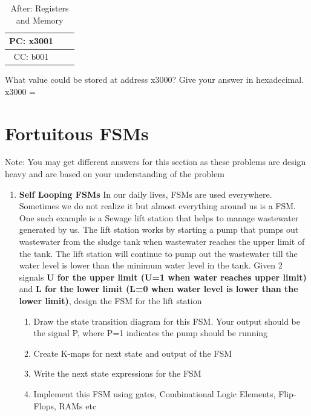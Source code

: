 \documentclass{article}
\begin{document}
\begin{enumerate}[label=(\alph*)]
\begin{enumerate}[label=(\roman*)]
\begin{table}[h]
\begin{tabular}{|c|c|c|}
            PC: x3001 & & \\
            \hline
            CC: b001 & & \\
            \hline
            \end{tabular}
            \caption{After: Registers and Memory}
            \end{table}
            \newline
            What value could be stored at address x3000? Give your answer in hexadecimal.
            \newline
            \newline
            x3000 =
        \end{enumerate}
        \newpage
    \end{enumerate}
    \section{Fortuitous FSMs}
    Note: You may get different answers for this section as these problems are design heavy and are based on your understanding of the problem
    \begin{enumerate}[label=(\alph*), itemsep = 120pt]
        \item \textbf{Self Looping FSMs} In our daily lives, FSMs are used everywhere. Sometimes we do not realize it but almost everything around us is a FSM. One such example is a Sewage lift station that helps to manage wastewater generated by us. The lift station works by starting a pump that pumps out wastewater from the sludge tank when wastewater reaches the upper limit of the tank. The lift station will continue to pump out the wastewater till the water level is lower than the minimum water level in the tank. Given 2 signals \textbf{U for the upper limit (U=1 when water reaches upper limit)} and \textbf{L for the lower limit (L=0 when water level is lower than the lower limit)}, design the FSM for the lift station
        \begin{enumerate}[label=(\roman*), itemsep = 120pt]
            \item Draw the state transition diagram for this FSM. Your output should be the signal P, where P=1 indicates the pump should be running
            \item Create K-maps for next state and output of the FSM
            \item Write the next state expressions for the FSM
            \item Implement this FSM using gates, Combinational Logic Elements, Flip-Flops, RAMs etc
        \end{enumerate}
    \end{enumerate}
    \newpage
\end{document}
